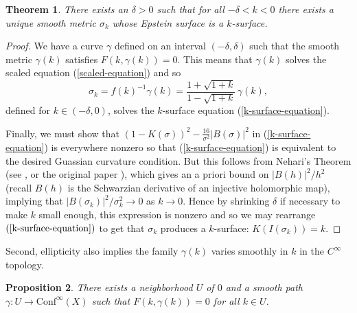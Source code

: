 \documentclass{amsart}
\newtheorem{thm}{Theorem}[section]
\newtheorem{prop}[thm]{Proposition}
\begin{document}
\begin{thm}
\label{k-surfaces-existence}
There exists an $\delta > 0$ such that for all $-\delta < k < 0$ there exists a unique smooth metric $\sigma_k$ whose Epstein surface is a $k$-surface.
\end{thm}

\begin{proof}
We have a curve $\gamma$ defined on an interval $(-\delta, \delta)$ such that the smooth metric $\gamma(k)$ satisfies $F(k,\gamma(k)) = 0$. 
This means that $\gamma(k)$ solves the scaled equation (\ref{scaled-equation}) and so 
\[
\sigma_k = f(k)^{-1} \gamma(k) =  \frac{1 + \sqrt{1+k}}{1 - \sqrt{1+k}} \, \gamma(k),
\]
defined for $k \in (-\delta,0)$, solves the $k$-surface equation (\ref{k-surface-equation}). 

Finally, we must show that $(1-K(\sigma))^2 - \frac{16}{\sigma^2} |B(\sigma)|^2$ in (\ref{k-surface-equation}) is everywhere nonzero so that (\ref{k-surface-equation}) is equivalent to the desired Guassian curvature condition.
But this follows from Nehari's Theorem (see \cite[Theorem 1.3]{lehto-1987}, or the original paper \cite{nehari-1949}), which gives an a priori bound on $|B(h)|^2/h^2$ (recall $B(h)$ is the Schwarzian derivative of an injective holomorphic map), implying that $|B(\sigma_k)|^2/\sigma_k^2 \to 0$ as $k \to 0$. 
Hence by shrinking $\delta$ if necessary to make $k$ small enough, this expression is nonzero and so we may rearrange $(\ref{k-surface-equation})$ to get that $\sigma_k$ produces a $k$-surface: $K(I(\sigma_k)) = k$.
\end{proof}

Second, ellipticity also implies the family $\gamma(k)$ varies smoothly in $k$ in the $C^\infty$ topology. 

\begin{prop}
There exists a neighborhood $U$ of $0$ and a smooth path $\gamma: U \to \mathrm{Conf}^\infty(X)$ such that $F(k,\gamma(k)) = 0$ for all $k \in U$. 
\end{prop}
\end{document}
